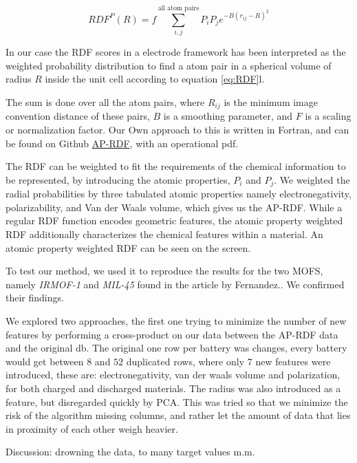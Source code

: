 \begin{equation}\label{eq:RDF}
RDF^P(R) = f \sum^{\text{all atom pairs}}_{i,j} P_i P_j e^{-B(r_{ij} - R)^2}
\end{equation}

In our case the RDF scores in a electrode framework has been interpreted as the weighted probability distribution to find a atom pair in a spherical volume of radius $R$ inside the unit cell according to equation \ref{eq:RDF}l.

The sum is done over all the atom pairs, where $R_{ij}$ is the minimum image convention distance of these pairs, $B$ is a smoothing parameter, and $F$ is a scaling or normalization factor. Our Own approach to this is written in Fortran, and can be found on Github \href{https://github.com/sondrt/Machine-Learning-the-Voltage-Capacity-and-Energy-density-of-Electrode-Materials/tree/master/AP-RDF}{AP-RDF}, with an operational pdf.

The RDF can be weighted to fit the requirements of the chemical information to be represented, by introducing the atomic properties, $P_i$ and $P_j$. We weighted the radial probabilities by three tabulated atomic properties namely electronegativity, polarizability, and Van der Waals volume, which gives us the AP-RDF. While a regular RDF function encodes geometric features, the atomic property weighted RDF additionally characterizes the chemical features within a material. An atomic property weighted RDF can be seen on the screen. 

To test our method, we used it to reproduce the results for the two MOFS, namely \textit{IRMOF-1} and \textit{MIL-45} found in the article by Fernandez.\cite{fernandez2013atomic}. We confirmed their findings.

	We explored two approaches, the first one trying to minimize the number of new features by performing a cross-product on our data between the AP-RDF data and the original db. The original one row per battery was changes, every battery would get between $8$ and $52$ duplicated rows, where only $7$ new features were introduced, these are: electronegativity, van der waals volume and polarization, for both charged and discharged materials. The radius was also introduced as a feature, but disregarded quickly by PCA.
 This was tried so that we minimize the risk of the algorithm missing columns, and rather let the amount of data that lies in proximity of each other weigh heavier.
	
	Discussion: drowning the data, to many target values m.m. 
	
